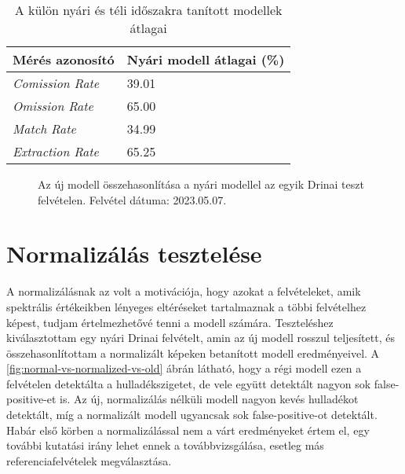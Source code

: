 \begin{table}[H]
	\centering
	\begin{tabular}{ | p{} | p{} | }
		\hline
		\textbf{Mérés azonosító} & \textbf{Nyári modell átlagai (\%)} \\
		\hline \hline
		\emph{Comission Rate} & 39.01 \\
		\hline
		\emph{Omission Rate} & 65.00  \\
		\hline
		\emph{Match Rate} & 34.99  \\
		\hline
        \emph{Extraction Rate} & 65.25 \\
		\hline
	\end{tabular}
	\caption{A külön nyári és téli időszakra tanított modellek átlagai}
	\label{tab:summer-winter-split}
\end{table}

\begin{figure}[H]
	\centering
	\hspace{5pt}
	\hspace{5pt}
	\caption{Az új modell összehasonlítása a nyári modellel az egyik Drinai teszt felvételen. Felvétel dátuma: 2023.05.07.}
	\label{fig:summer-vs-new}
\end{figure}

\section{Normalizálás tesztelése}
\label{ch:normalization-test} 

A normalizálásnak az volt a motivációja, hogy azokat a felvételeket, amik spektrális értékeikben lényeges eltéréseket tartalmaznak a többi felvételhez képest, tudjam értelmezhetővé tenni a modell számára. Teszteléshez kiválasztottam egy nyári Drinai felvételt, amin az új modell rosszul teljesített, és összehasonlítottam a normalizált képeken betanított modell eredményeivel. A \ref{fig:normal-vs-normalized-vs-old} ábrán látható, hogy a régi modell ezen a felvételen detektálta a hulladékszigetet, de vele együtt detektált nagyon sok false-positive-et is. Az új, normalizálás nélküli modell nagyon kevés hulladékot detektált, míg a normalizált modell ugyancsak sok false-positive-ot detektált. Habár első körben a normalizálással nem a várt eredményeket értem el, egy további kutatási irány lehet ennek a továbbvizsgálása, esetleg más referenciafelvételek megválasztása.

